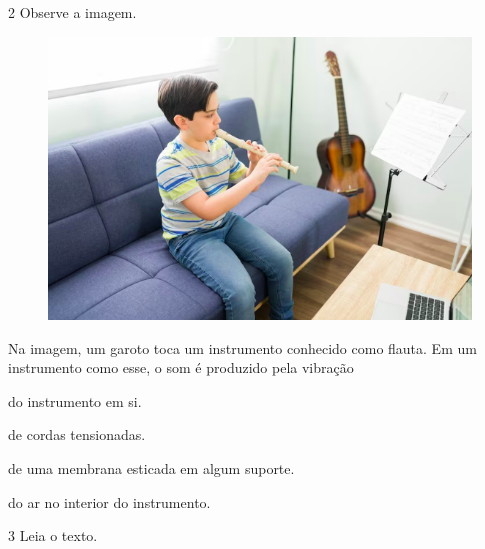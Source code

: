 
\num{2} Observe a imagem.

\begin{figure}[htpb!]
\includegraphics[width=\textwidth]{./imgs/art41.png}
\end{figure}

Na imagem, um garoto toca um instrumento conhecido como flauta. Em um instrumento como esse, o som é produzido pela vibração

\begin{minipage}{.5\textwidth}
\begin{escolha}
\item
  do instrumento em si.
\item
  de cordas tensionadas.
\item
  de uma membrana esticada em algum suporte.
\item
  do ar no interior do instrumento.
\end{escolha}
\end{minipage}

\num{3}  Leia o texto.

